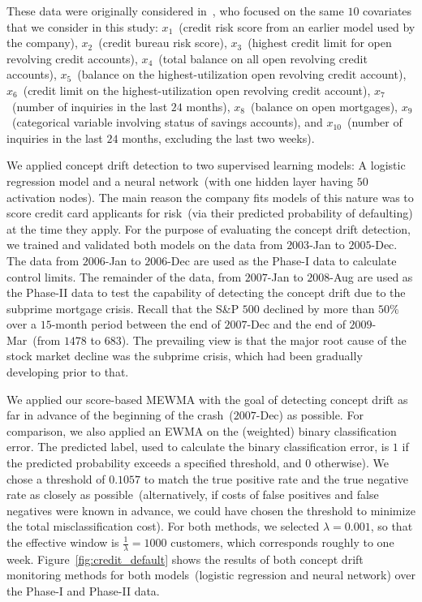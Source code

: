 \documentclass[twoside,11pt]{article}
\begin{document}
These data were originally considered in~\cite{im2012time}, who focused on the same $10$ covariates that we consider in this study: $x_1$~(credit risk score from an earlier model used by the company), $x_2$~(credit bureau risk score), $x_3$~(highest credit limit for open revolving credit accounts), $x_4$~(total balance on all open revolving credit accounts), $x_5$~(balance on the highest-utilization open revolving credit account), $x_6$~(credit limit on the highest-utilization open revolving credit account), $x_7$~(number of inquiries in the last $24$ months), $x_8$~(balance on open mortgages), $x_9$~(categorical variable involving status of savings accounts), and $x_{10}$~(number of inquiries in the last $24$ months, excluding the last two weeks). 

We applied concept drift detection to two supervised learning models:  A logistic regression model and a neural network~(with one hidden layer having $50$ activation nodes). The main reason the company fits models of this nature was to score credit card applicants for risk~(via their predicted probability of defaulting) at the time they apply. For the purpose of evaluating the concept drift detection, we trained and validated both models on the data from $2003$-Jan to $2005$-Dec. The data from $2006$-Jan to $2006$-Dec are used as the Phase-I data to calculate control limits. The remainder of the data, from $2007$-Jan to $2008$-Aug are used as the Phase-II data to test the capability of detecting the concept drift due to the subprime mortgage crisis. Recall that the S\&P $500$ declined by more than $50\%$ over a $15$-month period between the end of $2007$-Dec and the end of $2009$-Mar~(from $1478$ to $683$). The prevailing view is that the major root cause of the stock market decline was the subprime crisis, which had been gradually developing prior to that.

We applied our score-based MEWMA with the goal of detecting concept drift as far in advance of the beginning of the crash~($2007$-Dec) as possible. For comparison, we also applied an EWMA on the (weighted) binary classification error. The predicted label, used to calculate the binary classification error, is $1$ if the predicted probability exceeds a specified threshold, and $0$ otherwise). We chose a threshold of $0.1057$ to match the true positive rate and the true negative rate as closely as possible~(alternatively, if costs of false positives and false negatives were known in advance, we could have chosen the threshold to minimize the total misclassification cost). For both methods, we selected $\lambda = 0.001$, so that the effective window is $\frac{1}{\lambda} = 1000$ customers, which corresponds roughly to one week. Figure~\ref{fig:credit_default} shows the results of both concept drift monitoring methods for both models~(logistic regression and neural network) over the Phase-I and Phase-II data. 
\end{document}
